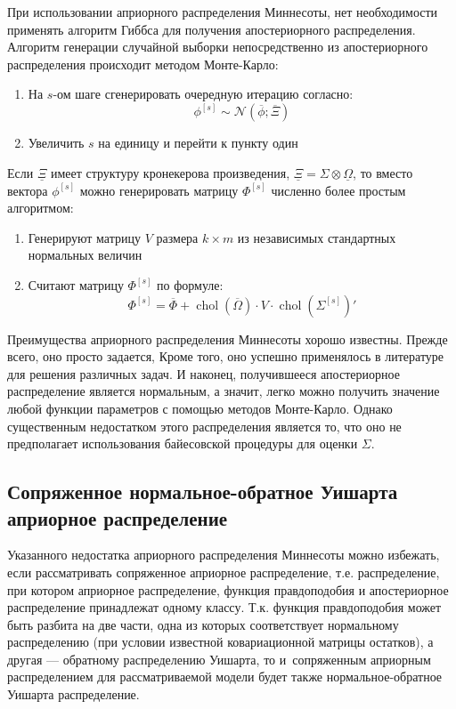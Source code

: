 \documentclass[11pt]{article} %
\DeclareMathOperator{\chol}{chol}
\newcommand{\cN}{\mathcal{N}}
\newcommand{\prior}{\underline}
\newcommand{\post}{\overline}
\begin{document}
При использовании априорного распределения Миннесоты, нет необходимости применять алгоритм Гиббса для получения апостериорного распределения. Алгоритм генерации случайной выборки непосредственно из апостериорного распределения происходит методом Монте-Карло:

\begin{enumerate}
\item На $s$-ом шаге сгенерировать очередную итерацию согласно:
\begin{equation}
\phi^{[s]}\sim \cN(\post \phi; \post \Xi)
\end{equation}
\item Увеличить $s$ на единицу и перейти к пункту один
\end{enumerate}

Если $\prior \Xi$ имеет структуру кронекерова произведения, $\prior \Xi = \Sigma \otimes \prior \Omega$, то вместо вектора $\phi^{[s]}$ можно генерировать матрицу $\Phi^{[s]}$ численно более простым алгоритмом:


\begin{enumerate}
\item Генерируют матрицу $V$ размера $k\times m$  из независимых стандартных нормальных величин
\item Считают матрицу $\Phi^{[s]}$ по формуле:
\[
\Phi^{[s]} = \post \Phi + \chol(\post\Omega) \cdot V \cdot \chol(\Sigma^{[s]})'
\]
\end{enumerate}

Преимущества априорного распределения Миннесоты хорошо известны. Прежде всего, оно просто задается, Кроме того, оно успешно применялось в литературе для решения различных задач. И наконец, получившееся апостериорное распределение является нормальным, а значит, легко можно получить значение любой функции параметров с помощью методов Монте-Карло. Однако существенным недостатком этого распределения является то, что оно не предполагает использования байесовской процедуры для оценки $\Sigma$.




\subsection{Сопряженное нормальное-обратное Уишарта априорное распределение}

Указанного недостатка априорного распределения Миннесоты можно избежать, если рассматривать сопряженное априорное распределение, т.е. распределение, при котором  априорное распределение, функция правдоподобия и апостериорное распределение принадлежат одному классу. Т.к. функция правдоподобия может быть разбита на две части, одна из которых соответствует нормальному распределению (при условии известной ковариационной матрицы остатков), а другая --- обратному распределению Уишарта, то и~сопряженным априорным распределением для рассматриваемой модели будет также нормальное-обратное Уишарта распределение.
\end{document}

